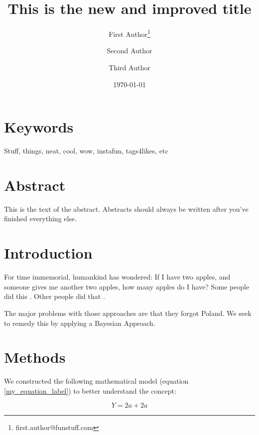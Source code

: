 \documentclass[11pt,letterpaper]{article} %
\date{\today}
\title{This is the new and improved title}
\author[1]{First Author\thanks{first.author@funstuff.com}}
\author[1,2]{Second Author}
\author[2]{Third Author}
\affil[1]{Department of Computer Science, \LaTeX\ University}
\affil[2]{Department of Mechanical Engineering, Superfabulous University}
\begin{document}
\maketitle
\linenumbers %
\def\linenumberfont{\normalfont\small\rmfamily} %


\section*{Keywords}
Stuff, things, neat, cool, wow, instafun, tags4likes, etc

\section*{Abstract}
This is the text of the abstract.
Abstracts should always be written after you've finished everything else.

\section*{Introduction}
For time immemorial, humankind has wondered: If I have two apples, and someone gives me another two apples, how many apples do I have? Some people did this \citep{Darwin1859}. Other people did that \citep{Wallace1869}. 

The major problems with those approaches are that they forgot Poland.
We seek to remedy this by applying a Bayesian Approach.

\section*{Methods}
We constructed the following mathematical model (equation \ref{my_equation_label}) to better understand the concept:

\begin{equation}\label{my_equation_label}
	Y = 2a + 2a
\end{equation}
\end{document}
